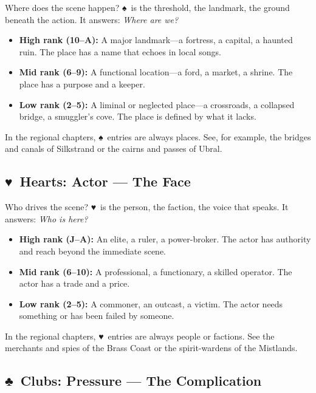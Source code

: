 \documentclass[12pt,oneside]{book}
\renewcommand{\spadesuit}{♠}
\renewcommand{\heartsuit}{♥}
\renewcommand{\clubsuit}{♣}
\begin{document}
Where does the scene happen? \spadesuit\ is the threshold, the landmark, the ground beneath the action. It answers: \textit{Where are we?}

\begin{itemize}
    \item \textbf{High rank (10--A):} A major landmark---a fortress, a capital, a haunted ruin. The place has a name that echoes in local songs.
    \item \textbf{Mid rank (6--9):} A functional location---a ford, a market, a shrine. The place has a purpose and a keeper.
    \item \textbf{Low rank (2--5):} A liminal or neglected place---a crossroads, a collapsed bridge, a smuggler's cove. The place is defined by what it lacks.
\end{itemize}

In the regional chapters, \spadesuit\ entries are always places. See, for example, the bridges and canals of Silkstrand or the cairns and passes of Ubral.

\subsection*{\heartsuit\ Hearts: Actor --- The Face}

Who drives the scene? \heartsuit\ is the person, the faction, the voice that speaks. It answers: \textit{Who is here?}

\begin{itemize}
    \item \textbf{High rank (J--A):} An elite, a ruler, a power-broker. The actor has authority and reach beyond the immediate scene.
    \item \textbf{Mid rank (6--10):} A professional, a functionary, a skilled operator. The actor has a trade and a price.
    \item \textbf{Low rank (2--5):} A commoner, an outcast, a victim. The actor needs something or has been failed by someone.
\end{itemize}

In the regional chapters, \heartsuit\ entries are always people or factions. See the merchants and spies of the Brass Coast or the spirit-wardens of the Mistlands.

\subsection*{\clubsuit\ Clubs: Pressure --- The Complication}
\end{document}
